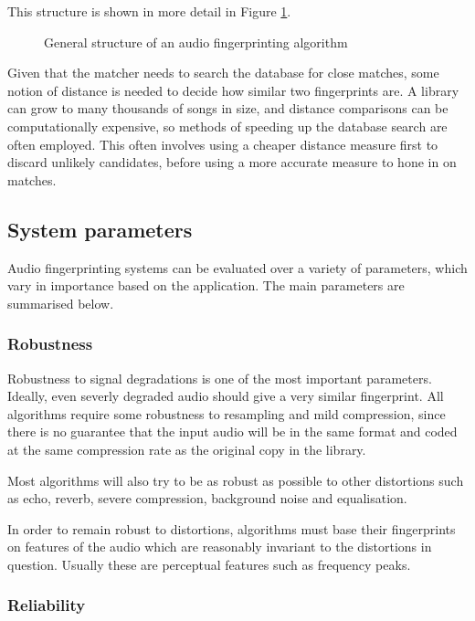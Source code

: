 \documentclass[12pt,a4paper,twoside,openright]{report}
\begin{document}
This structure is shown in more detail in Figure \ref{fig:generalframework}. 

\begin{figure}[h]
  \centering
  
  \caption{General structure of an audio fingerprinting algorithm}
  \label{fig:generalframework}
\end{figure}

Given that the matcher needs to search the database for close matches, some notion of distance is needed to decide how similar two fingerprints are. A library can grow to many thousands of songs in size, and distance comparisons can be computationally expensive, so methods of speeding up the database search are often employed. This often involves using a cheaper distance measure first to discard unlikely candidates, before using a more accurate measure to hone in on matches.


\subsection{System parameters}
\label{section:systemparams}

Audio fingerprinting systems can be evaluated over a variety of parameters, which vary in importance based on the application. The main parameters are summarised below.

\subsubsection{Robustness}

Robustness to signal degradations is one of the most important parameters. Ideally, even severly degraded audio should give a very similar fingerprint. All algorithms require some robustness to resampling and mild compression, since there is no guarantee that the input audio will be in the same format and coded at the same compression rate as the original copy in the library.

Most algorithms will also try to be as robust as possible to other distortions such as echo, reverb, severe compression, background noise and equalisation.

In order to remain robust to distortions, algorithms must base their fingerprints on features of the audio which are reasonably invariant to the distortions in question. Usually these are perceptual features such as frequency peaks.

\subsubsection{Reliability}
\end{document}
